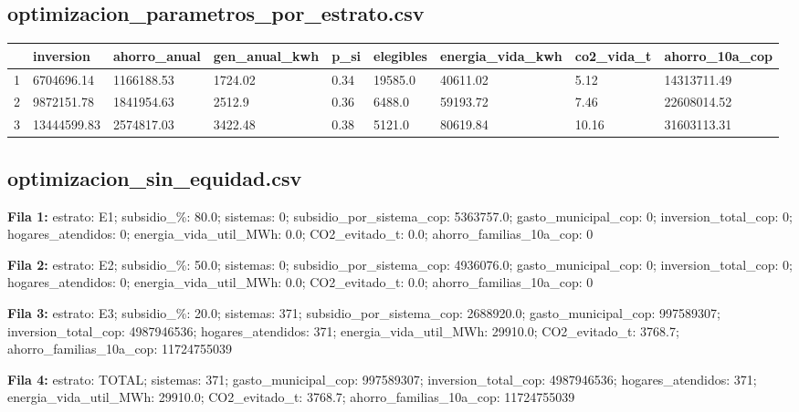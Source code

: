 \subsection*{optimizacion\_parametros\_por\_estrato.csv}
{\footnotesize\begin{longtable}{@{}lllllllll@{}}
\toprule
 & inversion & ahorro\_anual & gen\_anual\_kwh & p\_si & elegibles & energia\_vida\_kwh & co2\_vida\_t & ahorro\_10a\_cop \\
\midrule\endhead
1 & 6704696.14 & 1166188.53 & 1724.02 & 0.34 & 19585.0 & 40611.02 & 5.12 & 14313711.49 \\
2 & 9872151.78 & 1841954.63 & 2512.9 & 0.36 & 6488.0 & 59193.72 & 7.46 & 22608014.52 \\
3 & 13444599.83 & 2574817.03 & 3422.48 & 0.38 & 5121.0 & 80619.84 & 10.16 & 31603113.31 \\
\bottomrule
\end{longtable}}
\subsection*{optimizacion\_sin\_equidad.csv}
{\footnotesize\textbf{Fila 1:} estrato: E1; subsidio\_\%: 80.0; sistemas: 0; subsidio\_por\_sistema\_cop: 5363757.0; gasto\_municipal\_cop: 0; inversion\_total\_cop: 0; hogares\_atendidos: 0; energia\_vida\_util\_MWh: 0.0; CO2\_evitado\_t: 0.0; ahorro\_familias\_10a\_cop: 0\par}
{\footnotesize\textbf{Fila 2:} estrato: E2; subsidio\_\%: 50.0; sistemas: 0; subsidio\_por\_sistema\_cop: 4936076.0; gasto\_municipal\_cop: 0; inversion\_total\_cop: 0; hogares\_atendidos: 0; energia\_vida\_util\_MWh: 0.0; CO2\_evitado\_t: 0.0; ahorro\_familias\_10a\_cop: 0\par}
{\footnotesize\textbf{Fila 3:} estrato: E3; subsidio\_\%: 20.0; sistemas: 371; subsidio\_por\_sistema\_cop: 2688920.0; gasto\_municipal\_cop: 997589307; inversion\_total\_cop: 4987946536; hogares\_atendidos: 371; energia\_vida\_util\_MWh: 29910.0; CO2\_evitado\_t: 3768.7; ahorro\_familias\_10a\_cop: 11724755039\par}
{\footnotesize\textbf{Fila 4:} estrato: TOTAL; sistemas: 371; gasto\_municipal\_cop: 997589307; inversion\_total\_cop: 4987946536; hogares\_atendidos: 371; energia\_vida\_util\_MWh: 29910.0; CO2\_evitado\_t: 3768.7; ahorro\_familias\_10a\_cop: 11724755039\par}

